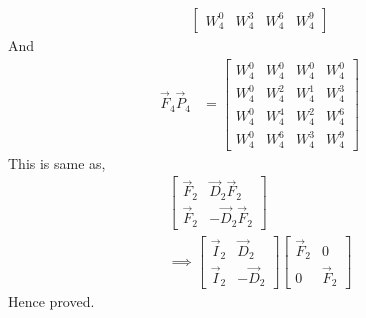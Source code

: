 \documentclass[journal,12pt,twocolumn]{IEEEtran}
\renewcommand\thesection{\arabic{section}}
\begin{document}
\begin{enumerate}[label=\thesection.\arabic*]
\begin{enumerate}[label=\arabic*.,ref=\thesection.\theenumi]
\begin{align}
\begin{bmatrix}
         W_4^0 & W_4^3 & W_4^6 & W_4^9   
       \end{bmatrix}
     \end{align}
     And 
     \begin{align}
       \vec{F}_{4}\vec{P}_{4} &= \begin{bmatrix}
         W_4^0 &  W_4^0& W_4^0 & W_4^0 \\
         W_4^0 & W_4^2 & W_4^1 & W_4^3  \\
         W_4^0 & W_4^4 & W_4^2 &  W_4^6 \\
         W_4^0 & W_4^6 & W_4^3 & W_4^9       
       \end{bmatrix}
     \end{align} 
     This is same as,
     \begin{align}
       \begin{bmatrix}
         \vec{F}_{2} & \vec{D}_{2}\vec{F}_{2} \\
         \vec{F}_{2} & -\vec{D}_{2}\vec{F}_{2}
       \end{bmatrix}\\
       \implies \begin{bmatrix}
         \vec{I}_{2} & \vec{D}_{2} \\
         \vec{I}_{2} & -\vec{D}_{2}
       \end{bmatrix}
       \begin{bmatrix}
         \vec{F}_{2} & 0 \\
         0 & \vec{F}_{2}   
       \end{bmatrix}   
     \end{align} 
     Hence proved.
     

\end{enumerate}
\end{enumerate}
\end{document}
